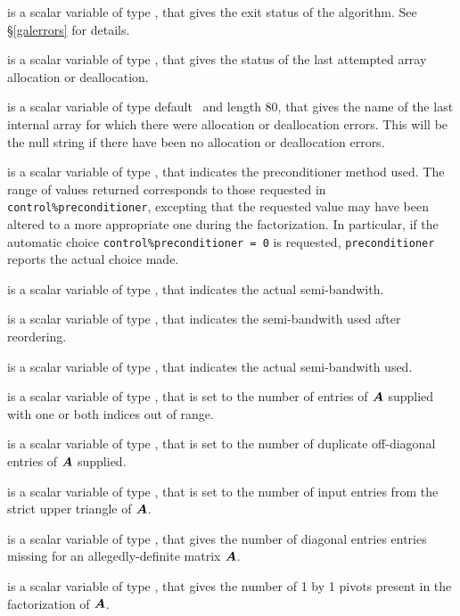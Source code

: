 \documentclass{galahad}
\begin{document}
\begin{description}

 is a scalar variable of type \integer, that gives the
exit status of the algorithm.
See \S\ref{galerrors}
for details.

 is a scalar variable of type \integer, that gives
the status of the last attempted array allocation or deallocation.

 is a scalar variable of type default \character\
and length 80, that  gives the name of the last internal array
for which there were allocation or deallocation errors.
This will be the null string if there have been no
allocation or deallocation errors.

 is a scalar variable of type \integer,
that indicates the preconditioner method used. The range of values returned
corresponds to those requested in {\tt control\%preconditioner},
excepting that the requested value may have been altered to a more
appropriate one during the factorization. In particular, if the automatic
choice {\tt control\%preconditioner = 0} is requested,
{\tt preconditioner} reports the actual choice made.

 is a scalar variable of type \integer,
that indicates the actual semi-bandwith.

 is a scalar variable of type \integer,
that indicates the semi-bandwith used after reordering.

 is a scalar variable of type \integer,
that indicates the actual semi-bandwith used.

 is a scalar variable of type \integer,
that is set to the number of
entries of ${\bm{A}}$ supplied with one or both indices out of range.

 is a scalar variable of type \integer,
that is set to the number of duplicate off-diagonal entries of ${\bm{A}}$ supplied.

 is a scalar variable of type \integer,
that is set to the number of input entries from the strict upper triangle
of ${\bm{A}}$.

 is a scalar variable of type \integer,
that gives the number of diagonal entries entries missing for an
allegedly-definite matrix ${\bm{A}}$.

 is a scalar variable of type \integer,
that gives the number of 1 by 1 pivots present in the factorization
of ${\bm{A}}$.


\end{description}
\end{document}
